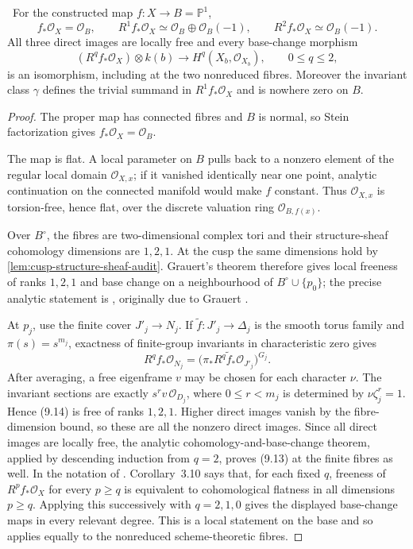 \begin{theorem}
\label{thm:structure-direct-images-audit}
\Verified\ For the constructed map \(f:X\to B=\mathbb P^1\),
\[
 f_*\mathcal O_X=\mathcal O_B,\qquad
 R^1f_*\mathcal O_X\simeq
 \mathcal O_B\oplus\mathcal O_B(-1),\qquad
 R^2f_*\mathcal O_X\simeq\mathcal O_B(-1).
\tag{9.12}
\]
All three direct images are locally free and every base-change morphism
\[
 (R^qf_*\mathcal O_X)\otimes k(b)
 \longrightarrow H^q(X_b,\mathcal O_{X_b}),
 \qquad 0\le q\le2,
\tag{9.13}
\]
is an isomorphism, including at the two nonreduced fibres.  Moreover the
invariant class \(\gamma\) defines the trivial summand in
\(R^1f_*\mathcal O_X\) and is nowhere zero on \(B\).
\end{theorem}

\begin{proof}
The proper map has connected fibres and \(B\) is normal, so Stein
factorization gives \(f_*\mathcal O_X=\mathcal O_B\).

The map is flat.  A local parameter on \(B\) pulls back to a nonzero
element of the regular local domain \(\mathcal O_{X,x}\); if it vanished
identically near one point, analytic continuation on the connected
manifold would make \(f\) constant.  Thus \(\mathcal O_{X,x}\) is
torsion-free, hence flat, over the discrete valuation ring
\(\mathcal O_{B,f(x)}\).

Over \(B^\circ\), the fibres are two-dimensional complex tori and their
structure-sheaf cohomology dimensions are \(1,2,1\).  At the cusp the same
dimensions hold by \cref{lem:cusp-structure-sheaf-audit}.  Grauert's
theorem therefore gives local freeness of ranks \(1,2,1\) and base change
on a neighbourhood of \(B^\circ\cup\{p_0\}\); the precise analytic statement is
\cite[Chapter~III, \S4, Theorem~4.12]{BanicaStanasila1976}, originally due to
Grauert \cite{Grauert1960}.

At \(p_j\), use the finite cover \(J'_j\to N_j\).  If
\(\widetilde f:J'_j\to\Delta_j\) is the smooth torus family and
\(\pi(s)=s^{m_j}\), exactness of finite-group invariants in characteristic
zero gives
\[
 R^qf_*\mathcal O_{N_j}
 =\bigl(\pi_*R^q\widetilde f_*\mathcal O_{J'_j}\bigr)^{G_j}.
\tag{9.14}
\]
After averaging, a free eigenframe \(v\) may be chosen for each character
\(\nu\).  The invariant sections are exactly
\(s^rv\,\mathcal O_{D_j}\), where \(0\le r<m_j\) is determined by
\(\nu\zeta_j^r=1\).  Hence (9.14) is free of ranks \(1,2,1\).
Higher direct images vanish by the fibre-dimension bound, so these are all
the nonzero direct images.  Since all direct images are locally free, the analytic
cohomology-and-base-change theorem, applied by descending induction from
\(q=2\), proves (9.13) at the finite fibres as well.  In the notation of
\cite[Chapter~III, \S3, Theorem~3.4, Corollaries~3.5, 3.7, and 3.10]
  {BanicaStanasila1976}.  Corollary~3.10 says that, for each fixed \(q\),
  freeness of \(R^p f_*\mathcal O_X\) for every \(p\ge q\) is equivalent to
  cohomological flatness in all dimensions \(p\ge q\).  Applying this
  successively with \(q=2,1,0\) gives the displayed base-change maps in every
  relevant degree.  This is a local statement on the base and so applies
  equally to the nonreduced scheme-theoretic fibres.


\end{proof}
